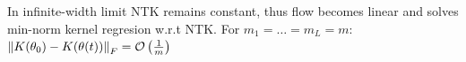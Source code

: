 \begin{lemma}
    In infinite-width limit NTK remains constant, thus flow becomes linear and solves min-norm kernel regresion w.r.t NTK. For \(m_1 = \ldots = m_L = m\): \(\norm{K(\theta_0) - K(\theta(t))}_F = \mathcal{O}\left(\frac 1 m \right)\)

\end{lemma}
